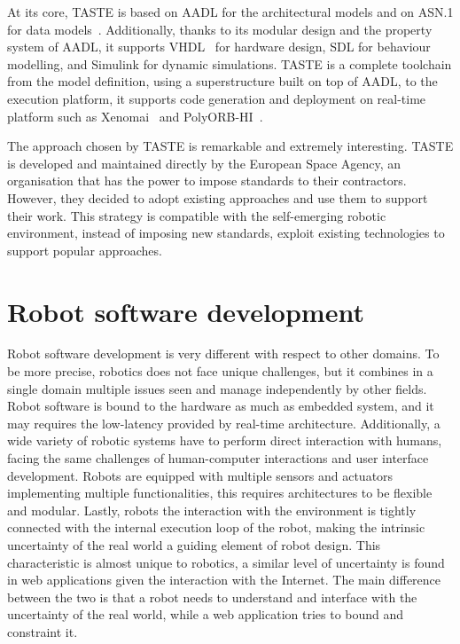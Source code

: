 At its core, TASTE is based on AADL for the architectural models and on ASN.1 for data models~\cite{perrotin2011taste}. Additionally, thanks to its modular design and the property system of AADL, it supports VHDL~\cite{navabi1997vhdl} for hardware design, SDL for behaviour modelling, and Simulink for dynamic simulations. TASTE is a complete toolchain from the model definition, using a superstructure built on top of AADL, to the execution platform, it supports code generation and deployment on real-time platform such as Xenomai~\cite{gerum2004xenomai} and PolyORB-HI~\cite{vergnaud2004polyorb}.

The approach chosen by TASTE is remarkable and extremely interesting. TASTE is developed and maintained directly by the European Space Agency, an organisation that has the power to impose standards to their contractors. However, they decided to adopt existing approaches and use them to support their work. This strategy is compatible with the self-emerging robotic environment, instead of imposing new standards, exploit existing technologies to support popular approaches.


\section{Robot software development}
Robot software development is very different with respect to other domains. To be more precise, robotics does not face unique challenges, but it combines in a single domain multiple issues seen and manage independently by other fields. Robot software is bound to the hardware as much as embedded system, and it may requires the low-latency provided by real-time architecture. Additionally, a wide variety of robotic systems have to perform direct interaction with humans, facing the same challenges of human-computer interactions and user interface development. Robots are equipped with multiple sensors and actuators implementing multiple functionalities, this requires architectures to be flexible and modular. Lastly, robots the interaction with the environment is tightly connected with the internal execution loop of the robot, making the intrinsic uncertainty of the real world a guiding element of robot design. This characteristic is almost unique to robotics, a similar level of uncertainty is found in web applications given the interaction with the Internet. The main difference between the two is that a robot needs to understand and interface with the uncertainty of the real world, while a web application tries to bound and constraint it.

